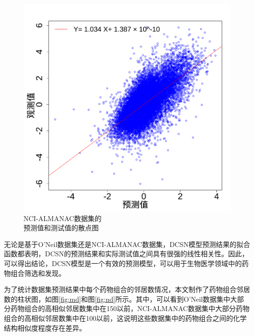 \begin{figure}[H]
\begin{minipage}{0.45\linewidth}
    \includegraphics[width=\textwidth]{figures/p_a_scatter.pdf}
    \caption{NCI-ALMANAC数据集的\\预测值和测试值的散点图\label{fig:nc}}
  \end{minipage}
\end{figure}

无论是基于O'Neil数据集还是NCI-ALMANAC数据集，DCSN模型预测结果的拟合函数都表明，DCSN的预测结果和实际测试值之间具有很强的线性相关性。因此，可以得出结论，DCSN模型是一个有效的预测模型，可以用于生物医学领域中的药物组合筛选和发现。

为了统计数据集预测结果中每个药物组合的邻居数情况，本文制作了药物组合邻居数的柱状图，如图\ref{fig:md}和图\ref{fig:nd}所示。其中，可以看到O'Neil数据集中大部分药物组合的高相似邻居数集中在150以前，NCI-ALMANAC数据集中大部分药物组合的高相似邻居数集中在100以前，这说明这些数据集中的药物组合之间的化学结构相似度程度存在差异。

